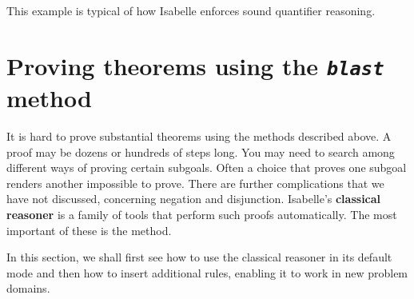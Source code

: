 This example is typical of how Isabelle enforces sound quantifier reasoning. 


\section{Proving theorems using the \emph{\texttt{blast}} method}

It is hard to prove substantial theorems using the methods 
described above. A proof may be dozens or hundreds of steps long.  You 
may need to search among different ways of proving certain 
subgoals. Often a choice that proves one subgoal renders another 
impossible to prove.  There are further complications that we have not
discussed, concerning negation and disjunction.  Isabelle's
\textbf{classical reasoner} is a family of tools that perform such
proofs automatically.  The most important of these is the 
{} method. 

In this section, we shall first see how to use the classical 
reasoner in its default mode and then how to insert additional 
rules, enabling it to work in new problem domains. 

